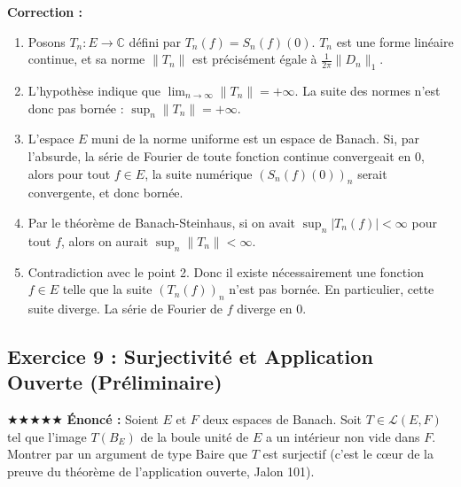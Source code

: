 \documentclass[11pt,a4paper]{article}
\begin{document}
\textbf{Correction :}
\begin{enumerate}
\item Posons $T_n : E \to \mathbb{C}$ défini par $T_n(f) = S_n(f)(0)$.
   $T_n$ est une forme linéaire continue, et sa norme $\|T_n\|$ est précisément égale à $\frac{1}{2\pi} \|D_n\|_1$.
\item L'hypothèse indique que $\lim_{n \to \infty} \|T_n\| = +\infty$.
   La suite des normes n'est donc pas bornée : $\sup_n \|T_n\| = +\infty$.
\item L'espace $E$ muni de la norme uniforme est un espace de Banach.
   Si, par l'absurde, la série de Fourier de toute fonction continue convergeait en $0$, alors pour tout $f \in E$, la suite numérique $(S_n(f)(0))_{n}$ serait convergente, et donc bornée.
\item Par le théorème de Banach-Steinhaus, si on avait $\sup_n |T_n(f)| < \infty$ pour tout $f$, alors on aurait $\sup_n \|T_n\| < \infty$.
\item Contradiction avec le point 2.
   Donc il existe nécessairement une fonction $f \in E$ telle que la suite $(T_n(f))_{n}$ n'est pas bornée.
   En particulier, cette suite diverge. La série de Fourier de $f$ diverge en $0$.
\end{enumerate}
\vspace{1cm}
\subsection*{Exercice 9 : Surjectivité et Application Ouverte (Préliminaire)}
$\bigstar\bigstar\bigstar\bigstar\bigstar$
\textbf{Énoncé :}
Soient $E$ et $F$ deux espaces de Banach.
Soit $T \in \mathcal{L}(E, F)$ tel que l'image $T(B_E)$ de la boule unité de $E$ a un intérieur non vide dans $F$.
Montrer par un argument de type Baire que $T$ est surjectif (c'est le cœur de la preuve du théorème de l'application ouverte, Jalon 101).
\end{document}
